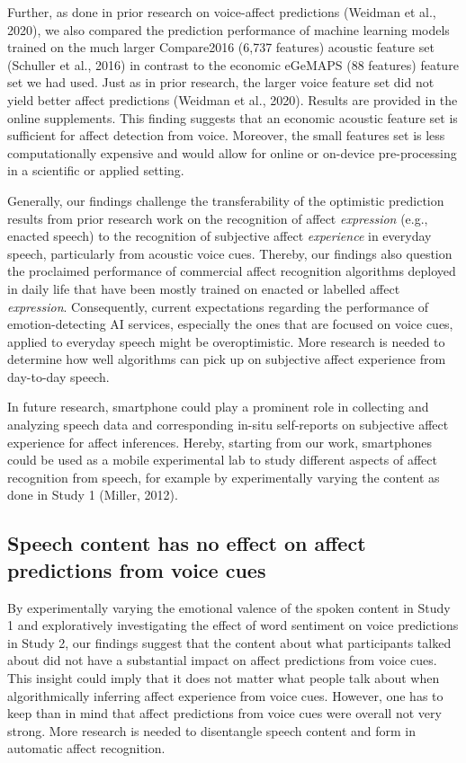 \documentclass[
  english,
  man,floatsintext]{apa6}
\begin{document}
Further, as done in prior research on voice-affect predictions (Weidman et al., 2020), we also compared the prediction performance of machine learning models trained on the much larger Compare2016 (6,737 features) acoustic feature set (Schuller et al., 2016) in contrast to the economic eGeMAPS (88 features) feature set we had used. Just as in prior research, the larger voice feature set did not yield better affect predictions (Weidman et al., 2020). Results are provided in the online supplements. This finding suggests that an economic acoustic feature set is sufficient for affect detection from voice. Moreover, the small features set is less computationally expensive and would allow for online or on-device pre-processing in a scientific or applied setting.

Generally, our findings challenge the transferability of the optimistic prediction results from prior research work on the recognition of affect \emph{expression} (e.g., enacted speech) to the recognition of subjective affect \emph{experience} in everyday speech, particularly from acoustic voice cues. Thereby, our findings also question the proclaimed performance of commercial affect recognition algorithms deployed in daily life that have been mostly trained on enacted or labelled affect \emph{expression}. Consequently, current expectations regarding the performance of emotion-detecting AI services, especially the ones that are focused on voice cues, applied to everyday speech might be overoptimistic. More research is needed to determine how well algorithms can pick up on subjective affect experience from day-to-day speech.

In future research, smartphone could play a prominent role in collecting and analyzing speech data and corresponding in-situ self-reports on subjective affect experience for affect inferences. Hereby, starting from our work, smartphones could be used as a mobile experimental lab to study different aspects of affect recognition from speech, for example by experimentally varying the content as done in Study 1 (Miller, 2012).

\hypertarget{speech-content-has-no-effect-on-affect-predictions-from-voice-cues}{%
\subsection{Speech content has no effect on affect predictions from voice cues}\label{speech-content-has-no-effect-on-affect-predictions-from-voice-cues}}

By experimentally varying the emotional valence of the spoken content in Study 1 and exploratively investigating the effect of word sentiment on voice predictions in Study 2, our findings suggest that the content about what participants talked about did not have a substantial impact on affect predictions from voice cues. This insight could imply that it does not matter what people talk about when algorithmically inferring affect experience from voice cues. However, one has to keep than in mind that affect predictions from voice cues were overall not very strong. More research is needed to disentangle speech content and form in automatic affect recognition.
\end{document}
